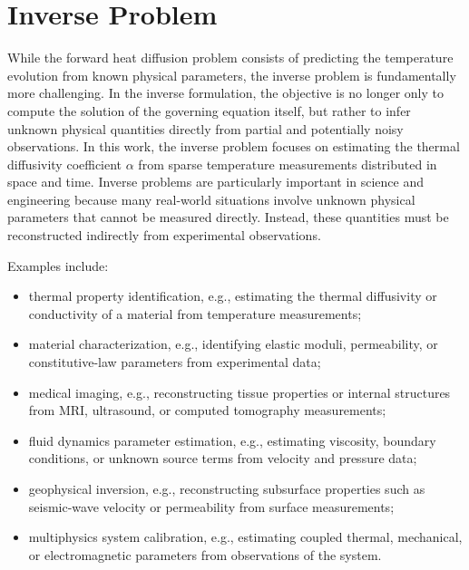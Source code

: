 \section{Inverse Problem}

While the forward heat diffusion problem consists of predicting the temperature evolution from known physical parameters, the inverse problem is fundamentally more challenging. In the inverse formulation, the objective is no longer only to compute the solution of the governing equation itself, but rather to infer unknown physical quantities directly from partial and potentially noisy observations. In this work, the inverse problem focuses on estimating the thermal diffusivity coefficient $\alpha$ from sparse temperature measurements distributed in space and time. Inverse problems are particularly important in science and engineering because many real-world situations involve unknown physical parameters that cannot be measured directly. Instead, these quantities must be reconstructed indirectly from experimental observations.

Examples include:
\begin{itemize}
    \item thermal property identification, e.g., estimating the thermal
    diffusivity or conductivity of a material from temperature measurements;

    \item material characterization, e.g., identifying elastic moduli,
    permeability, or constitutive-law parameters from experimental data;

    \item medical imaging, e.g., reconstructing tissue properties or internal
    structures from MRI, ultrasound, or computed tomography measurements;

    \item fluid dynamics parameter estimation, e.g., estimating viscosity,
    boundary conditions, or unknown source terms from velocity and pressure data;

    \item geophysical inversion, e.g., reconstructing subsurface properties
    such as seismic-wave velocity or permeability from surface measurements;

    \item multiphysics system calibration, e.g., estimating coupled thermal,
    mechanical, or electromagnetic parameters from observations of the system.
\end{itemize}


